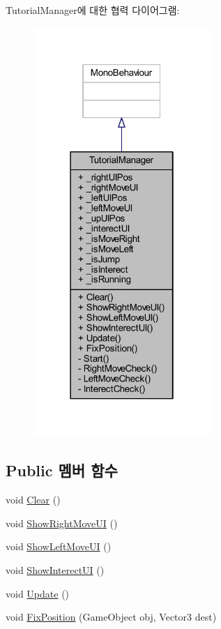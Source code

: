 Tutorial\+Manager에 대한 협력 다이어그램\+:\nopagebreak
\begin{figure}[H]
\begin{center}
\leavevmode
\includegraphics[width=190pt]{d8/de9/class_tutorial_manager__coll__graph}
\end{center}
\end{figure}
\subsection*{Public 멤버 함수}
\begin{DoxyCompactItemize}
\item 
void \mbox{\hyperlink{class_tutorial_manager_ad25e4771d3c09099d066991bca8c1203}{Clear}} ()
\item 
void \mbox{\hyperlink{class_tutorial_manager_ab5c041496c132c994a47cb144cae521d}{Show\+Right\+Move\+UI}} ()
\item 
void \mbox{\hyperlink{class_tutorial_manager_a852b4a32183004ef9513d7e43b99c247}{Show\+Left\+Move\+UI}} ()
\item 
void \mbox{\hyperlink{class_tutorial_manager_a11eddc71a4c6be52e2e52bbe0357afe4}{Show\+Interect\+UI}} ()
\item 
void \mbox{\hyperlink{class_tutorial_manager_a1afb4727c17e0b78186a92ce48bebace}{Update}} ()
\item 
void \mbox{\hyperlink{class_tutorial_manager_a09cf95368e659b0c1833572420b51257}{Fix\+Position}} (Game\+Object obj, Vector3 dest)
\end{DoxyCompactItemize}
